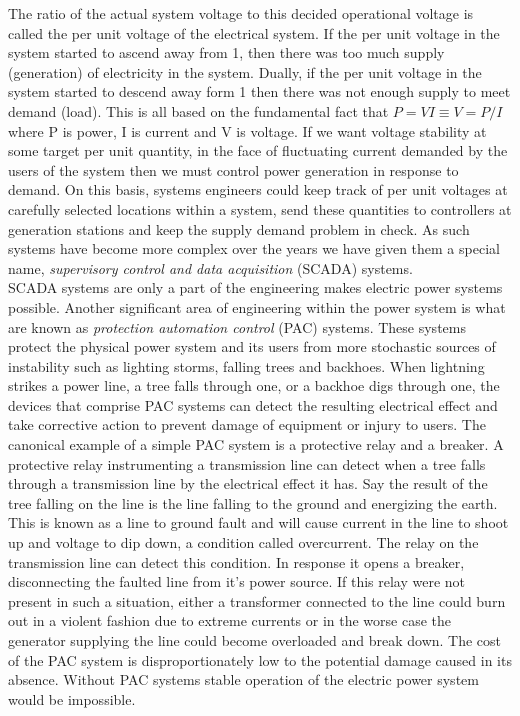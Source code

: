 \documentclass{article}
\begin{document}
The ratio of the actual system voltage to this decided operational voltage is called the 
per unit voltage of the electrical system.  If the per unit voltage in the system 
started to ascend away from 1, then there was too much supply (generation) of 
electricity in the system.  Dually, if the per unit voltage in the system started to 
descend away form 1 then there was not enough supply to meet demand (load).  This is 
all based on the fundamental fact that ${P = VI \equiv V = P/I}$ where P is power, I 
is current and V is voltage.  If we want voltage stability at some target per unit 
quantity, in the face of fluctuating current demanded by the users of the system then 
we must control power generation in response to demand.  On this basis, systems 
engineers could keep track of per unit voltages at carefully selected locations 
within a system, send these quantities to controllers at generation stations and 
keep the supply demand problem in check.  As such systems have become more complex 
over the years we have given them a special name, \emph{supervisory control and 
data acquisition} (SCADA) systems. \\

SCADA systems are only a part of the engineering makes electric power systems 
possible.  Another significant area of engineering within the power system is what 
are known as \emph{protection automation control} (PAC) systems.  These systems protect 
the physical power system and its users from more stochastic sources of instability 
such as lighting storms, falling trees and backhoes.  When lightning strikes a power 
line, a tree falls through one, or a backhoe digs through one, the devices that comprise 
PAC systems can detect the resulting electrical effect and take corrective action to 
prevent damage of equipment or injury to users.  The canonical example of a simple PAC 
system is a protective relay and a breaker.  A protective relay instrumenting a 
transmission line can detect when a tree falls through a transmission line by the 
electrical effect it has.  Say the result of the tree falling on the line is the line 
falling to the ground and energizing the earth.  This is known as a line to ground fault 
and will cause current in the line to shoot up and voltage to dip down, a condition 
called overcurrent.  The relay on the transmission line can detect this condition.  
In response it opens a breaker, disconnecting the faulted line from it's power source.  
If this relay were not present in such a situation, either a transformer connected to 
the line could burn out in a violent fashion due to extreme currents or in the worse 
case the generator supplying the line could become overloaded and break down.  The cost 
of the PAC system is disproportionately low to the potential damage caused in its 
absence.  Without PAC systems stable operation of the electric power system would be 
impossible. \\
\end{document}
